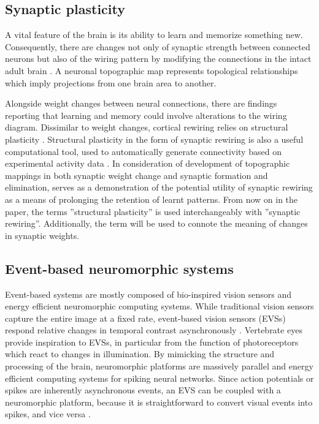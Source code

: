 \documentclass[sigconf]{acmart}
\begin{document}
\subsection{Synaptic plasticity}

A vital feature of the brain is its ability to learn and memorize something new. 
Consequently, there are changes not only of synaptic strength between connected neurons but also of the wiring pattern by modifying the connections in the intact adult brain \cite{albieri2015rapid}.
A neuronal topographic map represents topological relationships which imply projections from one brain area to another.

Alongside weight changes between neural connections, there are findings reporting that learning and memory  could involve alterations to the wiring diagram.
Dissimilar to weight changes, cortical rewiring relies on structural plasticity \cite{Chklovskii2004b}.
Structural plasticity in the form of synaptic rewiring is also a useful computational tool, used to automatically generate connectivity based on experimental activity data \cite{Diaz-Pier2016a}.
In consideration of development of topographic mappings in both synaptic weight change and synaptic formation and elimination, \cite{bamford2010synaptic} serves as a demonstration of the potential utility of synaptic rewiring as a means of prolonging the retention of learnt patterns.
From now on in the paper, the terms ''structural plasticity'' is used interchangeably with ''synaptic rewiring''.
Additionally, the term will be used to connote the meaning of changes in synaptic weights.

\subsection{Event-based neuromorphic systems}

Event-based systems are mostly composed of bio-inspired vision sensors and energy efficient neuromorphic computing systems. 
While traditional vision sensors capture the entire image at a fixed rate, event-based vision sensors (EVSs) respond relative changes in temporal contrast asynchronously \cite{Indiveri2015}.
Vertebrate eyes provide inspiration to EVSs, in particular from the function of photoreceptors which react to changes in illumination.
By mimicking the structure and processing of the brain, neuromorphic platforms are massively parallel and energy efficient computing systems for spiking neural networks.
Since action potentials or spikes are inherently asynchronous events, an EVS can be coupled with a neuromorphic platform, because it is straightforward to convert visual events into spikes, and vice versa  \cite{Gallego2019}.
\end{document}
